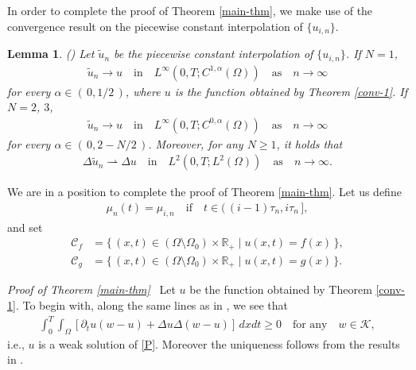 \documentclass[12pt]{amsart}
\newtheorem{lem}{Lemma}[section]
\begin{document}
In order to complete the proof of Theorem \ref{main-thm}, we make use of the convergence result on the piecewise constant 
interpolation of $\{ u_{i,n}\}$. 
\begin{lem}{\rm (\cite{NO})} \label{conv-piece-const}
Let $\tilde{u}_n$ be the piecewise constant interpolation of $\{ u_{i,n} \}$. If $N=1$, 
\begin{align*}
\tilde{u}_n \to u \quad \text{in} \quad L^\infty(0,T;C^{1,{\alpha}}(\Omega)) \quad \text{as} \quad n \to \infty 
\end{align*}
for every ${\alpha} \in (\, 0, 1/2 \,)$, where $u$ is the function obtained by Theorem \ref{conv-1}. 
If $N=2$, $3$, 
\begin{align*}
\tilde{u}_n \to u \quad \text{in} \quad L^\infty(0,T;C^{0,{\alpha}}(\Omega)) \quad \text{as} \quad n \to \infty 
\end{align*}
for every ${\alpha} \in (\, 0, 2-N/2 \,)$. Moreover, for any $N \ge 1$, it holds that 
\begin{align*}
\Delta \tilde{u}_n \rightharpoonup \Delta u \quad \text{in} \quad L^2(0,T;L^2(\Omega)) \quad \text{as} \quad n \to \infty.  
\end{align*} 
\end{lem}

We are in a position to complete the proof of Theorem \ref{main-thm}. Let us define  
\begin{align}
\mu_n(t) = \mu_{i,n} \quad \text{if} \quad t \in (\, (i-1) \tau_n, i \tau_n \,], 
\end{align}
and set 
\begin{align}
{\mathcal{C}}_f &= \{\, (x,t) \in (\Omega \setminus \Omega_0) \times {\mathbb{R}}_+ \mid u(x,t) = f(x) \,\}, \\
{\mathcal{C}}_g &= \{\, (x,t) \in (\Omega \setminus \Omega_0) \times {\mathbb{R}}_+ \mid u(x,t) = g(x) \,\}. 
\end{align}

\smallskip

\noindent
{\it Proof of Theorem \ref{main-thm}}\,\,\,
Let $u$ be the function obtained by Theorem \ref{conv-1}. 
To begin with, along the same lines as in \cite{NO}, we see that 
\begin{align}
\int^T_0 \!\!\! \int_\Omega \left[ {\partial}_t u (w-u) + \Delta u \Delta (w-u) \right] \, dx dt \ge 0 \quad \text{for any} \quad w \in {\mathcal{K}},  
\end{align}
i.e., $u$ is a weak solution of \eqref{P}. Moreover the uniqueness follows from the results in \cite{B}. 
\end{document}
